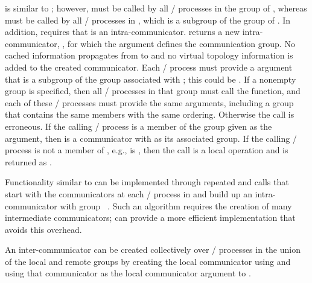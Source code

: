  is similar to
; however,  must
be called by all \MPI/ processes in the group of , whereas
 must be called by all \MPI/ processes in
, which is a subgroup of the group of . In
addition,  requires that
 is an
intra-communicator.  returns a new
intra-communicator, , for which the 
argument defines the communication group. No cached information
propagates from  to  and no virtual topology
information is added to the created communicator. Each \MPI/ process must
provide a  argument that is a subgroup of the group associated
with ; this could be . If a
nonempty group is specified, then all \MPI/ processes in that group must
call the function, and each of these \MPI/ processes must provide the same
arguments, including a group that contains the same members with the
same ordering. Otherwise the call is erroneous. If the calling \MPI/ process
is a member of the group given as the  argument, then
 is a communicator with  as its
associated group. If the calling \MPI/ process is not a member of
, e.g.,  is , then
the call is a local operation and  is returned
as .

\begin{rationale}
Functionality similar to  can be
implemented through repeated  and
 calls that start with the
 communicators at each \MPI/ process in
 and build up an intra-communicator with group
~\cite{DBLP:conf/pvm/DinanKBHKTV11}. Such an algorithm
requires the creation of many intermediate communicators;
 can provide a more efficient
implementation that avoids this overhead.
\end{rationale}

\begin{users}
An inter-communicator can be created collectively over \MPI/ processes in the union of the local and remote groups by creating the local communicator using  and using that communicator as the local communicator argument to .
\end{users}

